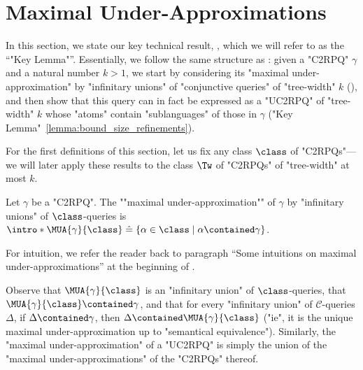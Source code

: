 \section{Maximal Under-Approximations}
\label{sec:maximal-under-approximations}

In this section, we state our key technical result, , which we will refer to as the ``"Key Lemma"''.
Essentially, we follow the same structure as :
given a "C2RPQ" $\gamma$ and a natural number $k>1$, we start by
considering its "maximal under-approximation" by "infinitary unions"
of "conjunctive queries" of "tree-width" $k$ (),
and then show that this query can in fact be expressed as a
"UC2RPQ" of "tree-width" $k$ whose "atoms" contain "sublanguages" of those in $\gamma$ ("Key Lemma"~\ref{lemma:bound_size_refinements}).

\AP For the first definitions of this section, let us fix any class $\class$ of "C2RPQs"---we will later apply these results to the class $\Tw$ of "C2RPQs" of "tree-width" at most $k$.

\begin{definition}
    \AP\label{def:max-under-approx}
    \AP Let $\gamma$ be a "C2RPQ". The \AP""maximal under-approximation"" of $\gamma$ by "infinitary unions" of $\class$-queries is $\intro*\MUA{\gamma}{\class} \defeq
    \{ \alpha \in \class \mid \alpha \contained\gamma \}$.
\end{definition}
For intuition, we refer the reader back to paragraph ``Some intuitions on maximal under-approximations'' at the beginning of .


\begin{remark}
    \AP\label{rk:uctworpq}
    Observe that $\MUA{\gamma}{\class}$ is an "infinitary union" of $\class$-queries,
    that $\MUA{\gamma}{\class} \contained \gamma$, and that for every "infinitary union" of
    $\mathcal{C}$-queries $\Delta$, if $\Delta \contained \gamma$, then $\Delta \contained \MUA{\gamma}{\class}$ ("ie", it is the unique maximal under-approximation up to "semantical equivalence").
    Similarly, the "maximal under-approximation" of a "UC2RPQ" is simply the union of the "maximal under-approximations" of the "C2RPQs" thereof.
\end{remark}


